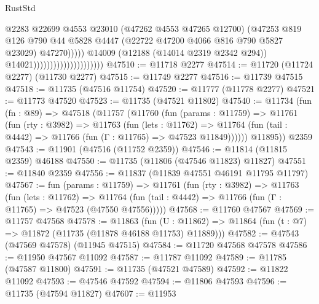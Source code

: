 \begin{lexlean}{RustStd}
\begin{coremodule}
                                                      @2283
                                                      @22699
                                                      @4553
                                                      @23010
                                                      (@47262 @4553 @47265 @12700)
                                                      (@47253
                                                        @819
                                                        @126
                                                        @790
                                                        @44
                                                        @5828
                                                        @4447
                                                        (@22722 @47200 @4066 @816 @790 @5827 @23029)
                                                        @47270)))))
                                              @14009
                                              (@12188 (@14014 @2319 @2342 @294))
                                              @14021)))))))))))))))))))))
@47510 := @11718 @2277
@47514 := @11720 (@11724 @2277) (@11730 @2277)
@47515 := @11749 @2277
@47516 := @11739 @47515
@47518 := @11735 (@47516 @11754)
@47520 := @11777 (@11778 @2277)
@47521 := @11773 @47520
@47523 := @11735 (@47521 @11802)
@47540 := @11734
    (fun (fn : @89) =>
    @47518
      (@11757
        (@11760
          (fun (params : @11759) =>
          @11761
            (fun (rty : @3982) =>
            @11763
              (fun (lets : @11762) =>
              @11764 (fun (tail : @4442) => @11766 (fun (Γ : @11765) => @47523 @11849))))))
        @11895))
    @2359
@47543 := @11901 (@47516 (@11752 @2359))
@47546 := @11814 (@11815 @2359) @46188
@47550 := @11735 (@11806 (@47546 @11823) @11827)
@47551 := @11840 @2359
@47556 := @11837 (@11839 @47551 @46191 @11795 @11797)
@47567 := fun (params : @11759) =>
  @11761
    (fun (rty : @3982) =>
    @11763
      (fun (lets : @11762) =>
      @11764 (fun (tail : @4442) => @11766 (fun (Γ : @11765) => @47523 (@47550 @47556)))))
@47568 := @11760 @47567
@47569 := @11757 @47568
@47578 := @11863
    (fun (U : @11862) => @11864 (fun (t : @7) => @11872 (@11735 (@11878 @46188 @11753) @11889)))
@47582 := @47543 (@47569 @47578) (@11945 @47515)
@47584 := @11720 @47568 @47578
@47586 := @11950 @47567 @11092
@47587 := @11787 @11092
@47589 := @11785 (@47587 @11800)
@47591 := @11735 (@47521 @47589)
@47592 := @11822 @11092
@47593 := @47546 @47592
@47594 := @11806 @47593
@47596 := @11735 (@47594 @11827)
@47607 := @11953

\end{coremodule}
\end{lexlean}

